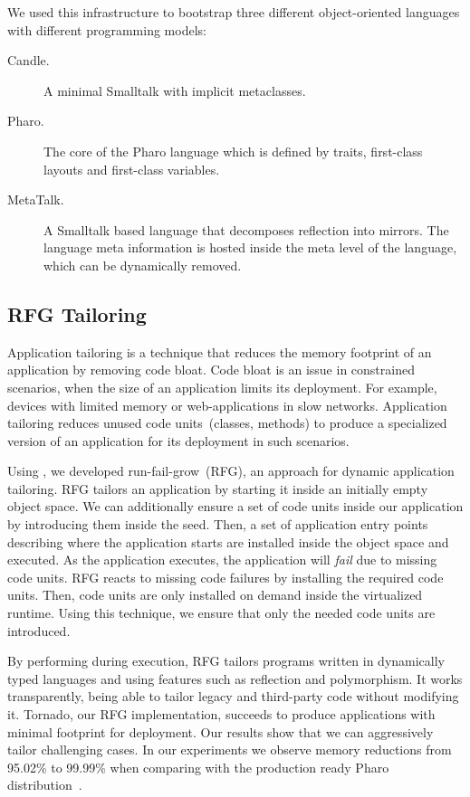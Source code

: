 We used this infrastructure to bootstrap three different object-oriented languages with different programming models: 
\begin{description}
\item[Candle.] A minimal Smalltalk with implicit metaclasses.
\item[Pharo.] The core of the Pharo language which is defined by traits, first-class layouts and first-class variables.
\item[MetaTalk.] A Smalltalk based language that decomposes reflection into mirrors. The language meta information is hosted inside the meta level of the language, which can be dynamically removed.
\end{description}

\subsection{RFG Tailoring} 

Application tailoring is a technique that reduces the memory footprint of an application by removing code bloat. Code bloat is an issue in constrained scenarios, when the size of an application limits its deployment. For example, devices with limited memory or web-applications in slow networks. Application tailoring reduces unused code units~(\eg classes, methods) to produce a specialized version of an application for its deployment in such scenarios.

Using \Vtt, we developed run-fail-grow~(RFG), an approach for dynamic application tailoring. RFG tailors an application by starting it inside an initially empty object space. We can additionally ensure a set of code units inside our application by introducing them inside the seed. Then, a set of application entry points describing where the application starts are installed inside the object space and executed. As the application executes, the application will \emph{fail} due to missing code units. RFG reacts to missing code failures by installing the required code units. Then, code units are only installed on demand inside the virtualized runtime. Using this technique, we ensure that only the needed code units are introduced.

By performing during execution, RFG tailors programs written in dynamically typed languages and using features such as reflection and polymorphism. It works transparently, being able to tailor legacy and third-party code without modifying it. Tornado, our RFG implementation, succeeds to produce applications with minimal footprint for deployment. Our results show that we can aggressively tailor challenging cases. In our experiments we observe memory reductions from 95.02\% to 99.99\% when comparing with the production ready Pharo distribution~\cite{Poli14a}.

